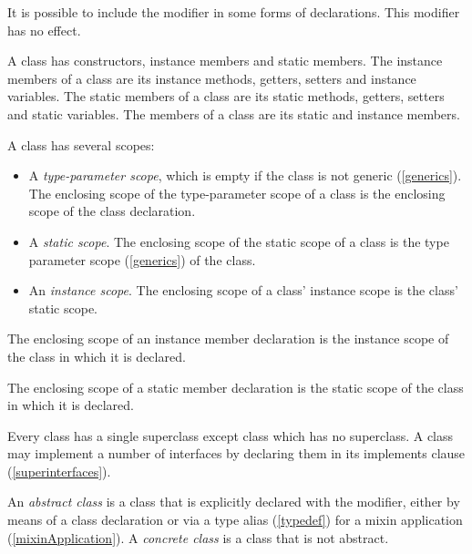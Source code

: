 \documentclass{article}
\begin{document}
\LMHash{}
It is possible to include the modifier \COVARIANT{} in some forms of declarations.
This modifier has no effect.


\LMHash{}
A class has constructors, instance members and static members.
The instance members of a class are its instance methods, getters, setters and instance variables.
The static members of a class are its static methods, getters, setters and static variables.
The members of a class are its static and instance members.

\LMHash{}
A class has several scopes:
\begin{itemize}
\item A {\em type-parameter scope}, which is empty if the class is not generic (\ref{generics}).
The enclosing scope of the type-parameter scope of a class is the enclosing scope of the class declaration.
\item A {\em static scope}.
The enclosing scope of the static scope of a class is the type parameter scope (\ref{generics}) of the class.
\item An {\em instance scope}.
The enclosing scope of a class' instance scope is the class' static scope.
\end{itemize}

\LMHash{}
The enclosing scope of an instance member declaration is the instance scope of the class in which it is declared.

\LMHash{}
The enclosing scope of a static member declaration is the static scope of the class in which it is declared.

\LMHash{}
Every class has a single superclass except class  which has no superclass.
A class may implement a number of interfaces by declaring them in its implements clause (\ref{superinterfaces}).

\LMHash{}
An {\em abstract class} is a class that is explicitly declared with the \ABSTRACT{} modifier, either by means of a class declaration or via a type alias (\ref{typedef}) for a mixin application (\ref{mixinApplication}).
A {\em concrete class} is a class that is not abstract.

\end{document}
